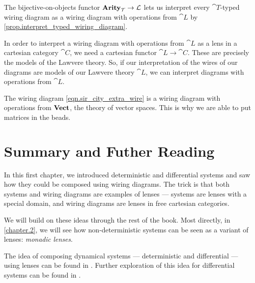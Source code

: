 \documentclass[DynamicalBook]{subfiles}
\begin{document}
\begin{remark}
The bijective-on-objects functor $\textbf{Arity}_{\mathcal{T}} \to \mathcal{L}$ lets
us interpret every $\cat{T}$-typed wiring diagram as a wiring diagram with
operations from $\cat{L}$ by \cref{prop.interpret_typed_wiring_diagram}.
\end{remark}

In order to interpret a wiring diagram with operations from $\cat{L}$ as a lens
in a cartesian category $\cat{C}$, we need a cartesian functor $\cat{L} \to
\cat{C}$. These are precisely the models of the Lawvere theory. So, if our
interpretation of the wires
of our diagrams are models of our Lawvere theory $\cat{L}$, we can interpret
diagrams with operations from $\cat{L}$.


\begin{example}
  The wiring diagram \cref{eqn.sir_city_extra_wire} is a wiring diagram with
  operations from $\textbf{Vect}$, the theory of vector spaces. This is why we are
  able to put matrices in the beads.
\end{example}

\section{Summary and Futher Reading}

In this first chapter, we introduced deterministic and differential systems and
saw how they could be composed using wiring diagrams. The trick is that both
systems and wiring diagrams are examples of lenses --- systems are lenses with a
special domain, and wiring diagrams are lenses in free cartesian categories.

We will build on these ideas through the rest of the book. Most directly, in \cref{chapter.2},
we will see how non-deterministic systems can be seen as a variant of lenses:
\emph{monadic lenses}.

The idea of composing dynamical systems --- deterministic and differential ---
using lenses can be found in
\cite{Vagner.Spivak.Lerman:2015a}. Further exploration of
this idea for differential systems can be found in \cite{Bakirtsiz-Vasilakopolou-Fleming:Compositional.Cyber.Physical.Systems.Modelling}. 
\end{document}
